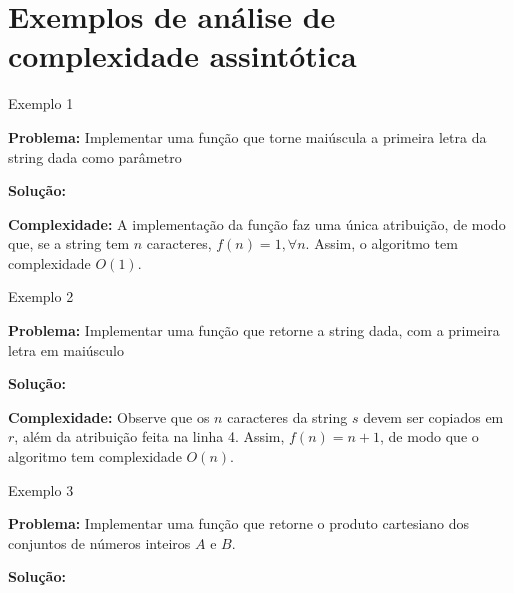 \section{Exemplos de análise de complexidade assintótica}

\begin{frame}[fragile]{Exemplo 1}

	\textbf{Problema:} Implementar uma função que torne maiúscula a primeira letra da string
        dada como parâmetro
	\vspace{0.1in}

	\textbf{Solução:} 
	\vspace{0.2in}

	{\bf Complexidade: } A implementação da função faz uma única atribuição, de modo que, se
        a string tem $n$ caracteres, $f(n) = 1, \forall n$. Assim, o algoritmo tem complexidade
        $O(1)$.

\end{frame} 

\begin{frame}[fragile]{Exemplo 2}

	\textbf{Problema:} Implementar uma função que retorne a string dada, com a primeira letra 
        em maiúsculo
	\vspace{0.1in}

	\textbf{Solução:} 
	\vspace{0.2in}

	{\bf Complexidade: } Observe que os $n$ caracteres da string $s$ devem ser copiados em $r$,
        além da atribuição feita na linha 4. Assim, $f(n) = n + 1$, de modo que o algoritmo tem 
        complexidade $O(n)$.

\end{frame} 


\begin{frame}[fragile]{Exemplo 3}

    {\bf Problema:} Implementar uma função que retorne o produto cartesiano dos conjuntos
        de números inteiros $A$ e $B$.
	\vspace{0.1in}

    {\bf Solução:} 
\end{frame} 

